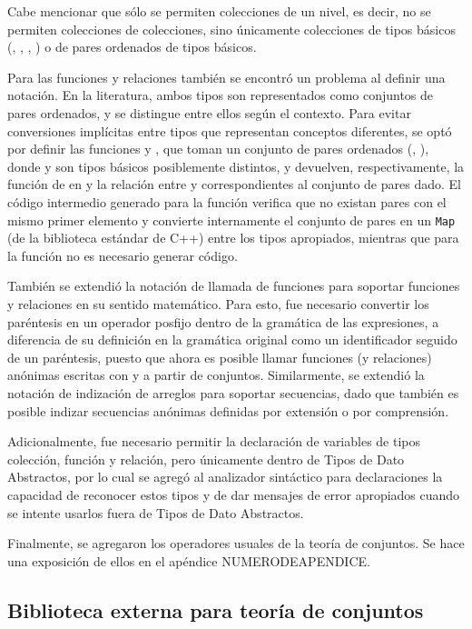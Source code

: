 {{Cabe mencionar que sólo se permiten colecciones de un nivel, es decir, no se
permiten colecciones de colecciones, sino únicamente colecciones de tipos
básicos (, , , ) o de pares
ordenados de tipos básicos.

Para las funciones y relaciones también se encontró un problema al definir una
notación. En la literatura, ambos tipos son representados como conjuntos de
pares ordenados, y se distingue entre ellos según el contexto. Para evitar
conversiones implícitas entre tipos que representan conceptos diferentes, se
optó por definir las funciones  y , que toman un conjunto
de pares ordenados (, ), donde  y  son tipos
básicos posiblemente distintos, y devuelven, respectivamente, la función de
 en  y la relación entre  y 
correspondientes al conjunto de pares dado. El código intermedio generado para
la función  verifica que no existan pares con el mismo primer
elemento y convierte internamente el conjunto de pares en un \texttt{Map} (de la
biblioteca estándar de C++) entre los tipos apropiados, mientras que para la
función  no es necesario generar código.

También se extendió la notación de llamada de funciones para soportar funciones
y relaciones en su sentido matemático. Para esto, fue necesario convertir los
paréntesis en un operador posfijo dentro de la gramática de las expresiones, a
diferencia de su definición en la gramática original como un identificador
seguido de un paréntesis, puesto que ahora es posible llamar funciones (y
relaciones) anónimas escritas con  y  a partir de
conjuntos. Similarmente, se extendió la notación de indización de arreglos para
soportar secuencias, dado que también es posible indizar secuencias anónimas
definidas por extensión o por comprensión.

Adicionalmente, fue necesario permitir la declaración de variables de tipos
colección, función y relación, pero únicamente dentro de Tipos de Dato
Abstractos, por lo cual se agregó al analizador sintáctico para declaraciones la
capacidad de reconocer estos tipos y de dar mensajes de error apropiados cuando
se intente usarlos fuera de Tipos de Dato Abstractos.

Finalmente, se agregaron los operadores usuales de la teoría de conjuntos. Se
hace una exposición de ellos en el apéndice NUMERODEAPENDICE.

\subsection{Biblioteca externa para teoría de conjuntos}

}}
